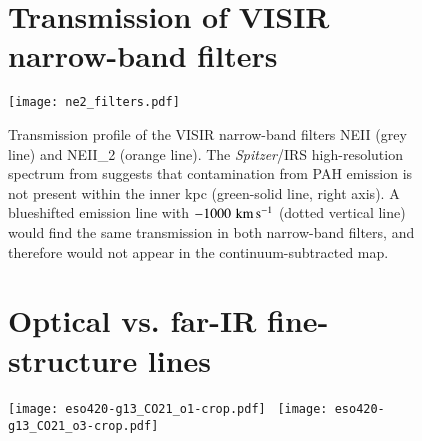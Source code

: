 \documentclass[longauth]{aa}
\newcommand{\kms}{\,\hbox{\hbox{km}\,\hbox{s}$^{-1}$}}
\begin{document}
{{{{{{{{{{\begin{appendix}
\begin{table}
\begin{tabular}{lcccc}
  \hline
\end{tabular}
\end{table}






\begin{figure}
\section{Transmission of VISIR narrow-band filters}
\centering
\texttt{[image: ne2\_filters.pdf]}
\caption{Transmission profile of the VISIR narrow-band filters NEII (grey line) and NEII\_2 (orange line). The \textit{Spitzer}/IRS high-resolution spectrum from  suggests that contamination from PAH emission is not present within the inner kpc (green-solid line, right axis). A blueshifted emission line with $-1000\, \rm{\kms}$ (dotted vertical line) would find the same transmission in both narrow-band filters, and therefore would not appear in the continuum-subtracted map. }\label{fig_ne2}
\end{figure}

\clearpage

\begin{figure}
\section{Optical vs. far-IR fine-structure lines}
\centering
\texttt{[image: eso420-g13\_CO21\_o1-crop.pdf]}~
\texttt{[image: eso420-g13\_CO21\_o3-crop.pdf]}
\vspace{0.1cm}


\end{figure}
\end{appendix}}}}}}}}}}}
\end{document}
